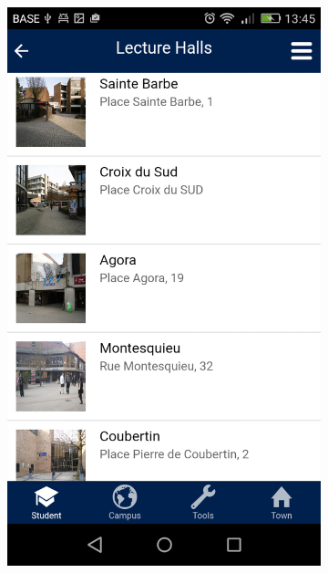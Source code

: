 \documentclass{eplmastersthesis}
\begin{document}
\begin{figure}
\begin{subfigure}[b]{0.3\textwidth}
        \includegraphics[width=\textwidth]{Images/Application_screens/Screenshot_2016-06-06-13-45-05.png}
    \end{subfigure}
\end{figure}
\end{document}
